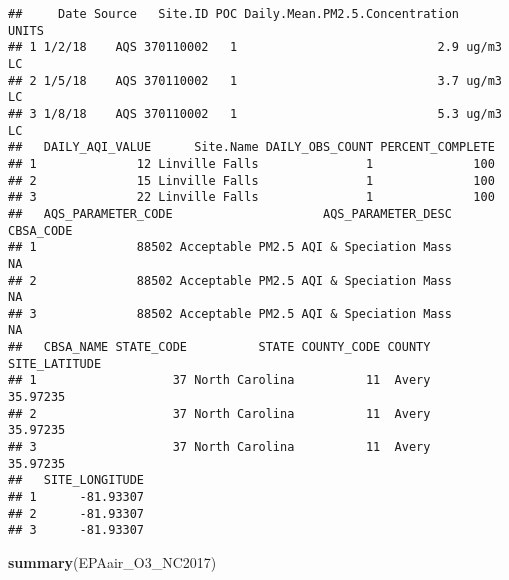 \documentclass[]{article}
\newenvironment{Shaded}{\begin{snugshade}}{\end{snugshade}}
\newcommand{\KeywordTok}[1]{\textcolor[rgb]{0.13,0.29,0.53}{\textbf{#1}}}
\newcommand{\NormalTok}[1]{#1}
\begin{document}
\begin{verbatim}
##     Date Source   Site.ID POC Daily.Mean.PM2.5.Concentration    UNITS
## 1 1/2/18    AQS 370110002   1                            2.9 ug/m3 LC
## 2 1/5/18    AQS 370110002   1                            3.7 ug/m3 LC
## 3 1/8/18    AQS 370110002   1                            5.3 ug/m3 LC
##   DAILY_AQI_VALUE      Site.Name DAILY_OBS_COUNT PERCENT_COMPLETE
## 1              12 Linville Falls               1              100
## 2              15 Linville Falls               1              100
## 3              22 Linville Falls               1              100
##   AQS_PARAMETER_CODE                     AQS_PARAMETER_DESC CBSA_CODE
## 1              88502 Acceptable PM2.5 AQI & Speciation Mass        NA
## 2              88502 Acceptable PM2.5 AQI & Speciation Mass        NA
## 3              88502 Acceptable PM2.5 AQI & Speciation Mass        NA
##   CBSA_NAME STATE_CODE          STATE COUNTY_CODE COUNTY SITE_LATITUDE
## 1                   37 North Carolina          11  Avery      35.97235
## 2                   37 North Carolina          11  Avery      35.97235
## 3                   37 North Carolina          11  Avery      35.97235
##   SITE_LONGITUDE
## 1      -81.93307
## 2      -81.93307
## 3      -81.93307
\end{verbatim}

\begin{Shaded}
\begin{Highlighting}[]
\KeywordTok{summary}\NormalTok{(EPAair_O3_NC2017)}
\end{Highlighting}
\end{Shaded}
\end{document}
